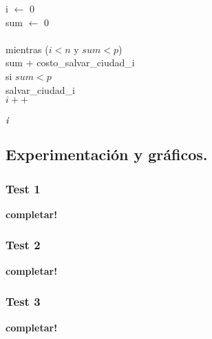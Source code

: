 \\
\\
\\
\\
\begin{codebox}
\\
i $\longleftarrow$ 0\\
sum $\longleftarrow$ 0\\
\\
mientras ($i<n$ y $sum<p$) \\
   
   \quad sum $+$ costo_salvar_ciudad_i\\
   
   \quad si $sum<p$\\
      \quad  \qquad salvar_ciudad_i\\
  \quad $i++$\\
   \\
\Return $\id{i}$       
 
\end{codebox} 



\newpage
\subsection{Experimentación y gráficos.}

\vspace*{0.3cm}

\subsubsection{Test 1}

\vspace*{0.3cm}

\textbf{completar!}


\newpage
\subsubsection{Test 2}

\vspace*{0.3cm}

\textbf{completar!}


\newpage
\subsubsection{Test 3}

\vspace*{0.3cm}

\textbf{completar!}
